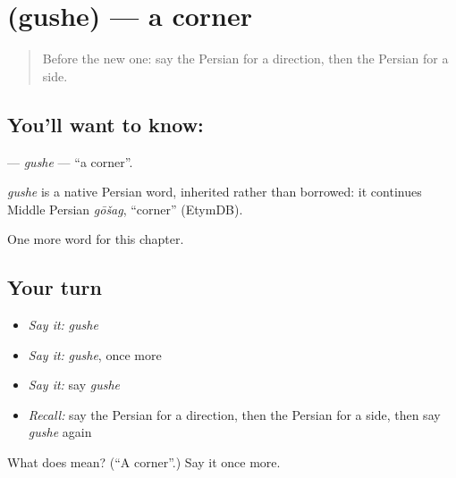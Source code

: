 \section[\texorpdfstring{\fa{گوشه} (gushe)}{گوشه (gushe)}]{ (gushe) — a corner}

\label{lesson:FA-C86-gushe}



\begin{quote}
Before the new one: say the Persian for a direction, then the Persian for a side.
\end{quote}

\subsection*{You'll want to know: }
\textbf{} — \emph{gushe} — \textquotedblleft{}a corner\textquotedblright{}.

\begin{cousinweb}
\emph{gushe} is a native Persian word, inherited rather than borrowed: it continues Middle Persian \emph{gōšag}, \textquotedblleft{}corner\textquotedblright{} (EtymDB).
\end{cousinweb}

\begin{grammarlens}[title={What you've built}]
One more word for this chapter.
\end{grammarlens}

\subsection*{Your turn}
\begin{itemize}
\raggedright
  \item \emph{Say it:} \emph{gushe}
  \item \emph{Say it:} \emph{gushe}, once more
  \item \emph{Say it:} say \emph{gushe}
  \item \emph{Recall:} say the Persian for a direction, then the Persian for a side, then say \emph{gushe} again
\end{itemize}

\begin{tcolorbox}[breakable,colback=teal!4,colframe=teal!35!black,title={Before you move on}]
What does  mean? (\textquotedblleft{}A corner\textquotedblright{}.) Say it once more.
\end{tcolorbox}
